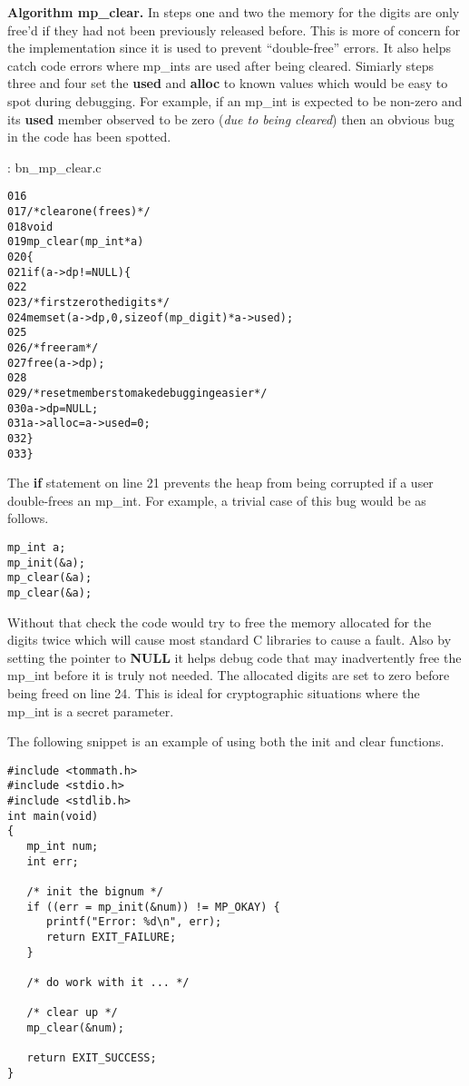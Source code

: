 \documentclass[b5paper]{book}
\begin{document}
\textbf{Algorithm mp\_clear.}
In steps one and two the memory for the digits are only free'd if they had not been previously released before.  
This is more of concern for the implementation since it is used to prevent ``double-free'' errors.  It also helps catch
code errors where mp\_ints are used after being cleared.  Simiarly steps three and four set the 
\textbf{used} and \textbf{alloc} to known values which would be easy to spot during debugging.  For example, if an mp\_int is expected
to be non-zero and its \textbf{used} member observed to be zero (\textit{due to being cleared}) then an obvious bug in the code has been
spotted.

\vspace{+3mm}\begin{small}
\hspace{-5.1mm}{\bf File}: bn\_mp\_clear.c
\vspace{-3mm}
\begin{alltt}
016   
017   /* clear one (frees)  */
018   void
019   mp_clear (mp_int * a)
020   \{
021     if (a->dp != NULL) \{
022   
023       /* first zero the digits */
024       memset (a->dp, 0, sizeof (mp_digit) * a->used);
025   
026       /* free ram */
027       free (a->dp);
028   
029       /* reset members to make debugging easier */
030       a->dp = NULL;
031       a->alloc = a->used = 0;
032     \}
033   \}
\end{alltt}
\end{small}

The \textbf{if} statement on line 21 prevents the heap from being corrupted if a user double-frees an 
mp\_int.  For example, a trivial case of this bug would be as follows.

\begin{verbatim}
mp_int a;
mp_init(&a);
mp_clear(&a);
mp_clear(&a);
\end{verbatim}

Without that check the code would try to free the memory allocated for the digits twice which will cause most standard C
libraries to cause a fault.  Also by setting the pointer to \textbf{NULL} it helps debug code that may inadvertently 
free the mp\_int before it is truly not needed.  The allocated digits are set to zero before being freed on line 24.  
This is ideal for cryptographic situations where the mp\_int is a secret parameter.

The following snippet is an example of using both the init and clear functions.  

\begin{small}
\begin{verbatim}
#include <tommath.h>
#include <stdio.h>
#include <stdlib.h>
int main(void)
{
   mp_int num;
   int err;
   
   /* init the bignum */
   if ((err = mp_init(&num)) != MP_OKAY) {
      printf("Error: %d\n", err);
      return EXIT_FAILURE;
   }
   
   /* do work with it ... */
   
   /* clear up */
   mp_clear(&num);
   
   return EXIT_SUCCESS;
}
\end{verbatim}
\end{small}
\end{document}
